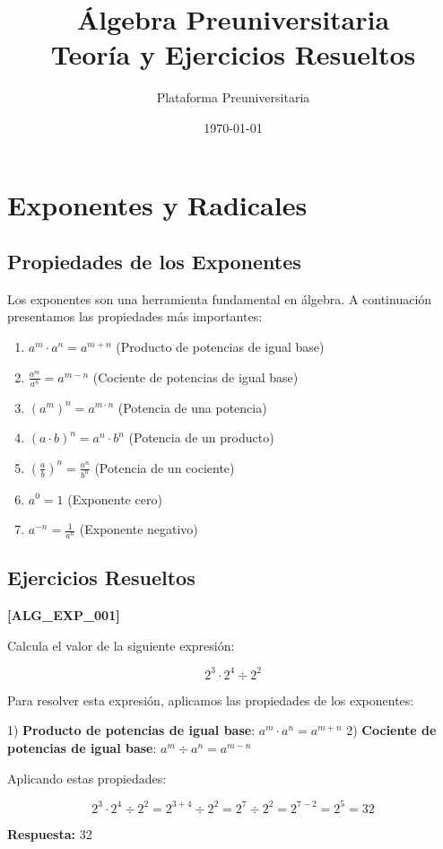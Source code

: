 \documentclass[12pt,a4paper]{book}
\title{\Huge \textbf{Álgebra Preuniversitaria}\\[0.5cm]
       \Large Teoría y Ejercicios Resueltos}
\author{Plataforma Preuniversitaria}
\date{\today}
\newenvironment{ejercicio}[1][]{%
    \begin{trivlist}\item[\hskip \labelsep {\bfseries Ejercicio.}]
    \if\relax\detokenize{#1}\relax
    \else
        \textbf{[#1]}
    \fi
}{%
    \end{trivlist}
}
\newenvironment{solucion}{%
    \begin{trivlist}\item[\hskip \labelsep {\bfseries Solución.}]
    \color{blue}
}{%
    \color{black}
    \end{trivlist}
}
\begin{document}
\maketitle

\tableofcontents
\newpage

\chapter{Exponentes y Radicales}

\section{Propiedades de los Exponentes}

Los exponentes son una herramienta fundamental en álgebra. A continuación presentamos las propiedades más importantes:

\begin{enumerate}
    \item $a^m \cdot a^n = a^{m+n}$ (Producto de potencias de igual base)
    \item $\frac{a^m}{a^n} = a^{m-n}$ (Cociente de potencias de igual base)
    \item $(a^m)^n = a^{m \cdot n}$ (Potencia de una potencia)
    \item $(a \cdot b)^n = a^n \cdot b^n$ (Potencia de un producto)
    \item $\left(\frac{a}{b}\right)^n = \frac{a^n}{b^n}$ (Potencia de un cociente)
    \item $a^0 = 1$ (Exponente cero)
    \item $a^{-n} = \frac{1}{a^n}$ (Exponente negativo)
\end{enumerate}

\section{Ejercicios Resueltos}


\begin{ejercicio}[ALG\_EXP\_001]
Calcula el valor de la siguiente expresión:

$$2^3 \cdot 2^4 \div 2^2$$

\begin{solucion}
Para resolver esta expresión, aplicamos las propiedades de los exponentes:

1) \textbf{Producto de potencias de igual base}: $a^m \cdot a^n = a^{m+n}$
2) \textbf{Cociente de potencias de igual base}: $a^m \div a^n = a^{m-n}$

Aplicando estas propiedades:

$$2^3 \cdot 2^4 \div 2^2 = 2^{3+4} \div 2^2 = 2^7 \div 2^2 = 2^{7-2} = 2^5 = 32$$

\textbf{Respuesta:} 32
\end{solucion}
\end{ejercicio}
\end{document}
